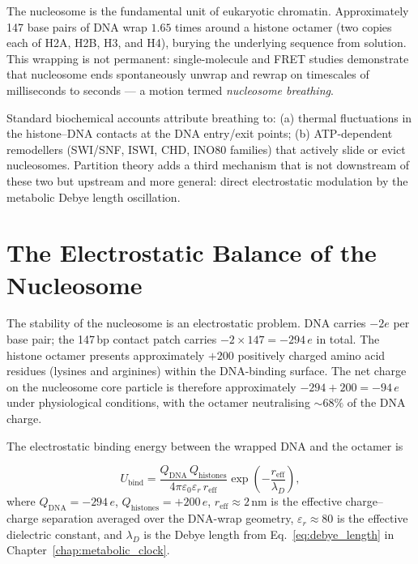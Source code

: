 The nucleosome is the fundamental unit of eukaryotic chromatin. Approximately
147 base pairs of DNA wrap $1.65$ times around a histone octamer (two copies
each of H2A, H2B, H3, and H4), burying the underlying sequence from
solution. This wrapping is not permanent: single-molecule and FRET studies
demonstrate that nucleosome ends spontaneously unwrap and rewrap on timescales
of milliseconds to seconds --- a motion termed \emph{nucleosome breathing}.

Standard biochemical accounts attribute breathing to: (a) thermal fluctuations
in the histone--DNA contacts at the DNA entry/exit points; (b) ATP-dependent
remodellers (SWI/SNF, ISWI, CHD, INO80 families) that actively slide or
evict nucleosomes. Partition theory adds a third mechanism that is not
downstream of these two but upstream and more general: direct electrostatic
modulation by the metabolic Debye length oscillation.

\section{The Electrostatic Balance of the Nucleosome}
\label{sec:nucleosome_electrostatics}

The stability of the nucleosome is an electrostatic problem. DNA carries
$-2e$ per base pair; the 147\,bp contact patch carries
$-2 \times 147 = -294\,e$ in total. The histone octamer presents approximately
$+200$ positively charged amino acid residues (lysines and arginines) within
the DNA-binding surface. The net charge on the nucleosome core particle is
therefore approximately $-294 + 200 = -94\,e$ under physiological conditions,
with the octamer neutralising $\sim 68\%$ of the DNA charge.

The electrostatic binding energy between the wrapped DNA and the octamer is

\begin{equation}
  U_{\mathrm{bind}} = \frac{Q_{\mathrm{DNA}}\,Q_{\mathrm{histones}}}{4\pi\varepsilon_0\varepsilon_r\,r_{\mathrm{eff}}}
  \exp\!\left(-\frac{r_{\mathrm{eff}}}{\lambda_D}\right),
  \label{eq:nucleosome_binding_energy}
\end{equation}
where $Q_{\mathrm{DNA}} = -294\,e$, $Q_{\mathrm{histones}} = +200\,e$,
$r_{\mathrm{eff}} \approx 2$\,nm is the effective charge--charge separation
averaged over the DNA-wrap geometry, $\varepsilon_r \approx 80$ is the
effective dielectric constant, and $\lambda_D$ is the Debye length from
Eq.~\eqref{eq:debye_length} in Chapter~\ref{chap:metabolic_clock}.

